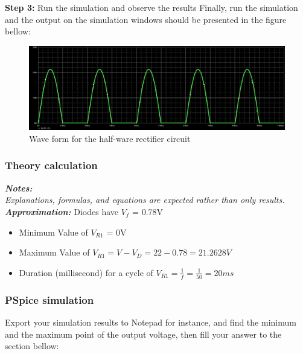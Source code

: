 \textbf{Step 3: } Run the simulation and observe the results
Finally, run the simulation and the output on the simulation windows should be presented in  the figure bellow:

\begin{figure}[!htp]
    \label{pic:halfwave_rectifier6}
    \centering
    \includegraphics[width = 5in]{source/picture/bai_2/diode_9.PNG}
    \caption{Wave form for the half-ware rectifier circuit}
    \label{lab02_ex031h}
\end{figure}



\subsubsection{Theory calculation}
\textit{\textbf{Notes:}}\\
\textit{Explanations, formulas, and equations are expected rather than only results.}\\

\textbf{\textit{Approximation:}} Diodes have $V_f$ = 0.78V\\
\begin{itemize}
    \item Minimum Value of $V_{R1}$ = 0V \dotfill\\
    \item Maximum Value of $V_{R1} = V - V_D = 22 - 0.78 = 21.2628V$\dotfill\\
    \item Duration (millisecond) for a cycle of $V_{R1} = \frac{1}{f} = \frac{1}{50} = 20ms$ \dotfill\\
\end{itemize}

\subsubsection{PSpice simulation}
Export your simulation results to Notepad for instance, and find the minimum and the maximum point of the output voltage, then fill your answer to the section bellow:


